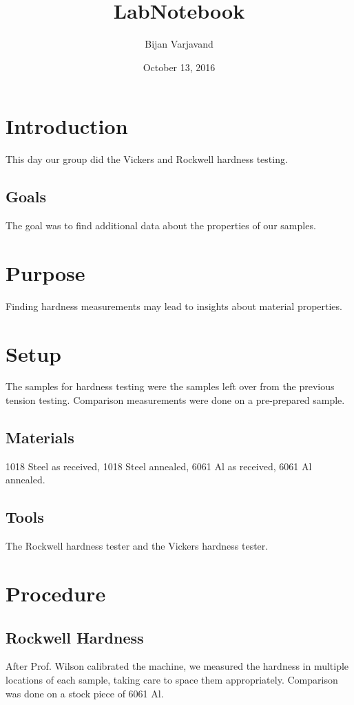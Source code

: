 \documentclass{article}
\author{Bijan Varjavand}
\title{LabNotebook}
\date{October 13, 2016}
\begin{document}
\maketitle

\section{Introduction}

This day our group did the Vickers and Rockwell hardness testing.
\subsection{Goals}

The goal was to find additional data about the properties of our samples.
\section{Purpose}

Finding hardness measurements may lead to insights about material properties.
\section{Setup}

The samples for hardness testing were the samples left over from the previous tension testing. Comparison measurements were done on a pre-prepared sample.
\subsection{Materials}

1018 Steel as received, 1018 Steel annealed, 6061 Al as received, 6061 Al annealed.
\subsection{Tools}

The Rockwell hardness tester and the Vickers hardness tester.
\section{Procedure}

\subsection{Rockwell Hardness}

After Prof. Wilson calibrated the machine, we measured the hardness in multiple locations of each sample, taking care to space them appropriately. Comparison was done on a stock piece of 6061 Al.
\end{document}
